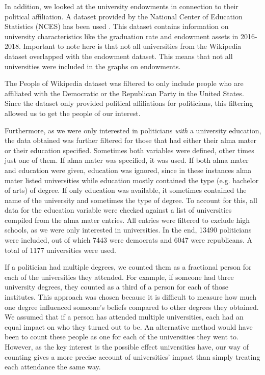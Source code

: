 \documentclass{article}
\begin{document}
In addition, we looked at the university endowments in connection to their political affiliation. A dataset provided by the National Center of Education Statistics (NCES) has been used \cite{ipeds}. This dataset contains information on university characteristics like the graduation rate and endowment assets in 2016-2018. Important to note here is that not all universities from the Wikipedia dataset overlapped with the endowment dataset. This means that not all universities were included in the graphs on endowments. 

The People of Wikipedia dataset was filtered to only include people who are affiliated with the Democratic or the Republican Party in the United States. Since the dataset only provided political affiliations for politicians, this filtering allowed us to get the people of our interest.

Furthermore, as we were only interested in politicians \textit{with} a university education, the data obtained was further filtered for those that had either their alma mater or their education specified. Sometimes both variables were defined, other times just one of them. If alma mater was specified, it was used. If both alma mater and education were given, education was ignored, since in these instances alma mater listed universities while education mostly contained the type (e.g. bachelor of arts) of degree. If only education was available, it sometimes contained the name of the university and sometimes the type of degree. To account for this, all data for the education variable were checked against a list of universities compiled from the alma mater entries. All entries were filtered to exclude high schools, as we were only interested in universities. In the end, 13490 politicians were included, out of which 7443 were democrats and 6047 were republicans. A total of 1177 universities were used.

If a politician had multiple degrees, we counted them as a fractional person for each of the universities they attended. For example, if someone had three university degrees, they counted as a third of a person for each of those institutes. This approach was chosen because it is difficult to measure how much one degree influenced someone’s beliefs compared to other degrees they obtained. We assumed that if a person has attended multiple universities, each had an equal impact on who they turned out to be. An alternative method would have been to count these people as one for each of the universities they went to. However, as the key interest is the possible effect universities have, our way of counting gives a more precise account of universities’ impact than simply treating each attendance the same way.
\end{document}
